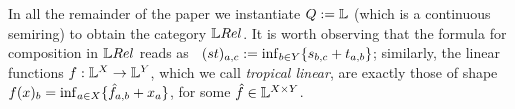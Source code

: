 In all the remainder of the paper we instantiate $Q:=\mathbb{L}$ (which is a continuous semiring) to obtain the category $\LREL$.%
It is worth observing that the formula for composition in $\LREL$ %
reads as \ $(st)_{a,c}:=\inf_{b\in Y}\{s_{b,c}+t_{a,b}\}$;
similarly, the linear functions $f:\mathbb{L}^X\to \mathbb{L}^Y$, %
which we call \emph{tropical linear}, are exactly those of shape $f(x)_b=\inf_{a\in X} \{\hat{f}_{a,b}+x_a\}$, for some $\hat{f}\in\mathbb{L}^{X\times Y}$.







%
%
%
% 

